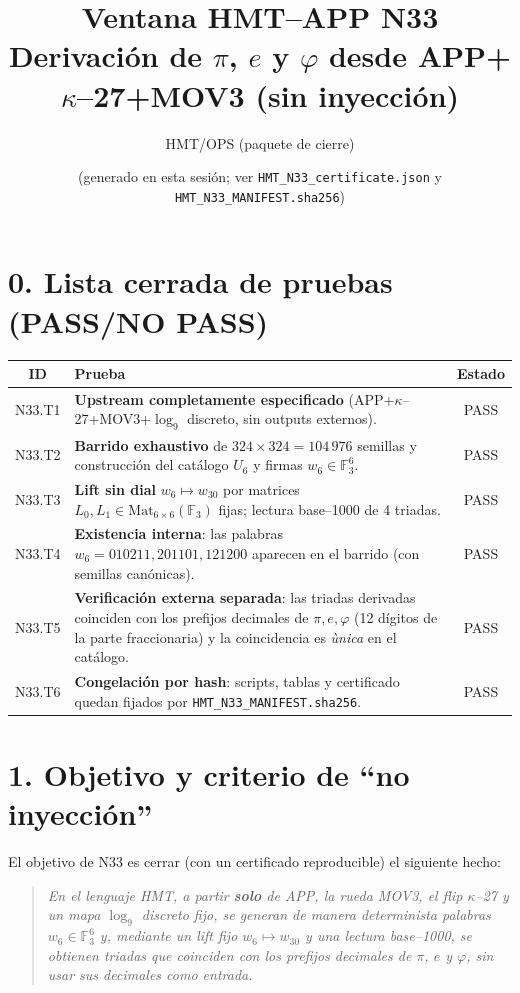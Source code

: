 \documentclass[11pt,a4paper]{article}
\title{\bfseries Ventana HMT--APP N33\\
\large Derivaci\'on de $\pi$, $e$ y $\varphi$ desde APP+$\kappa$--27+MOV3 (sin inyecci\'on)}
\author{HMT/OPS (paquete de cierre)}
\date{\small (generado en esta sesi\'on; ver \texttt{HMT\_N33\_certificate.json} y \texttt{HMT\_N33\_MANIFEST.sha256})}
\theoremstyle{plain}
\theoremstyle{definition}
\theoremstyle{remark}
\begin{document}
\maketitle
\small

\section*{0. Lista cerrada de pruebas (PASS/NO PASS)}
\begin{center}
\renewcommand{\arraystretch}{1.15}
\begin{tabular}{|c|p{12.7cm}|c|}
\hline
\textbf{ID} & \textbf{Prueba} & \textbf{Estado}\\
\hline
N33.T1 & \textbf{Upstream completamente especificado} (APP+$\kappa$--27+MOV3+$\log_9$ discreto, sin outputs externos). & PASS\\
\hline
N33.T2 & \textbf{Barrido exhaustivo} de $324\times 324=104\,976$ semillas y construcci\'on del cat\'alogo $U_6$ y firmas $w_6\in\mathbb F_3^6$. & PASS\\
\hline
N33.T3 & \textbf{Lift sin dial} $w_6\mapsto w_{30}$ por matrices $L_0,L_1\in\mathrm{Mat}_{6\times 6}(\mathbb F_3)$ fijas; lectura base--1000 de 4 triadas. & PASS\\
\hline
N33.T4 & \textbf{Existencia interna}: las palabras $w_6=010211,201101,121200$ aparecen en el barrido (con semillas can\'onicas). & PASS\\
\hline
N33.T5 & \textbf{Verificaci\'on externa separada}: las triadas derivadas coinciden con los prefijos decimales de $\pi,e,\varphi$ (12 d\'igitos de la parte fraccionaria) y la coincidencia es \emph{\`unica} en el cat\'alogo. & PASS\\
\hline
N33.T6 & \textbf{Congelaci\'on por hash}: scripts, tablas y certificado quedan fijados por \texttt{HMT\_N33\_MANIFEST.sha256}. & PASS\\
\hline
\end{tabular}
\end{center}

\section*{1. Objetivo y criterio de ``no inyecci\'on''}

El objetivo de N33 es cerrar (con un certificado reproducible) el siguiente hecho:

\begin{quote}
\emph{En el lenguaje HMT, a partir \emph{\textbf{solo}} de APP, la rueda MOV3, el flip $\kappa$--27 y un mapa $\log_9$ discreto fijo, se generan de manera determinista palabras $w_6\in\mathbb F_3^6$ y, mediante un lift fijo $w_6\mapsto w_{30}$ y una lectura base--1000, se obtienen triadas que coinciden con los prefijos decimales de $\pi$, $e$ y $\varphi$, sin usar sus decimales como entrada.}
\end{quote}
\end{document}
